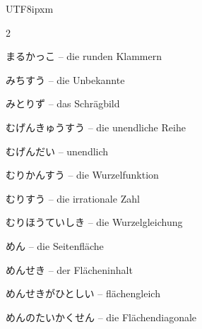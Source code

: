 \begin{CJK}{UTF8}{ipxm}
\begin{multicols}{2}
\par\nopagebreak
{} {\footnotesize\color{black!70}まるかっこ} -- die runden Klammern\dotfill\hyperref[e:88]{\pageref*{e:88}}\par
{} {\footnotesize\color{black!70}みちすう} -- die Unbekannte\dotfill\hyperref[e:73]{\pageref*{e:73}}\par
{} {\footnotesize\color{black!70}みとりず} -- das Schrägbild\dotfill\hyperref[e:254]{\pageref*{e:254}}\par
{} {\footnotesize\color{black!70}むげんきゅうすう} -- die unendliche Reihe\dotfill\hyperref[e:266]{\pageref*{e:266}}\par
{} {\footnotesize\color{black!70}むげんだい} -- unendlich\dotfill\hyperref[e:70]{\pageref*{e:70}}\par
{} {\footnotesize\color{black!70}むりかんすう} -- die Wurzelfunktion\dotfill\hyperref[e:128]{\pageref*{e:128}}\par
{} {\footnotesize\color{black!70}むりすう} -- die irrationale Zahl\dotfill\hyperref[e:9]{\pageref*{e:9}}\par
{} {\footnotesize\color{black!70}むりほうていしき} -- die Wurzelgleichung\dotfill\hyperref[e:83]{\pageref*{e:83}}\par
{} {\footnotesize\color{black!70}めん} -- die Seitenfläche\dotfill\hyperref[e:247]{\pageref*{e:247}}\par
{} {\footnotesize\color{black!70}めんせき} -- der Flächeninhalt\dotfill\hyperref[e:210]{\pageref*{e:210}}\par
{} {\footnotesize\color{black!70}めんせきがひとしい} -- flächengleich\dotfill\hyperref[e:195]{\pageref*{e:195}}\par
{} {\footnotesize\color{black!70}めんのたいかくせん} -- die Flächendiagonale\dotfill\hyperref[e:251]{\pageref*{e:251}}\par


\end{multicols}
\end{CJK}

